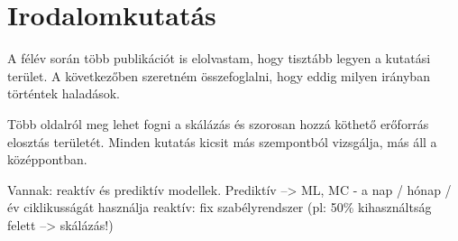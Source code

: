 \chapter{Irodalomkutatás}
\label{sec:Publications}
A félév során több publikációt is elolvastam, hogy tisztább legyen a kutatási terület. A következőben szeretném összefoglalni, hogy eddig milyen irányban történtek haladások.

Több oldalról meg lehet fogni a skálázás és szorosan hozzá köthető erőforrás elosztás területét. Minden kutatás kicsit más szempontból vizsgálja, más áll a középpontban.

Vannak: reaktív és prediktív modellek.
Prediktív --> ML, MC
  - a nap / hónap / év ciklikusságát használja 
reaktív: fix szabélyrendszer (pl: 50\% kihasználtság felett --> skálázás!)



